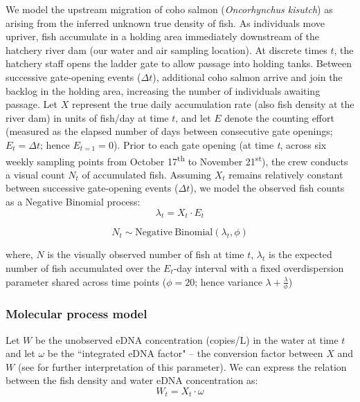 \documentclass{article}
\begin{document}
We model the upstream migration of coho salmon (\textit{Oncorhynchus kisutch}) as arising from the inferred unknown true density of fish. As individuals move upriver, fish accumulate in a holding area immediately downstream of the hatchery river dam (our water and air sampling location). At discrete times $t$, the hatchery staff opens the ladder gate to allow passage into holding tanks. Between successive gate-opening events ($\Delta t$), additional coho salmon arrive and join the backlog in the holding area, increasing the number of individuals awaiting passage. Let $X$ represent the true daily accumulation rate (also fish density at the river dam) in units of fish/day at time $t$, and let $E$ denote the counting effort (measured as the elapsed number of days between consecutive gate openings; $E_t =\Delta t$; hence $ E_{t=1} = 0$). Prior to each gate opening (at time \textit{t}, across six weekly sampling points from October 17\textsuperscript{th} to November 21\textsuperscript{st}), the crew conducts a visual count $N_t$ of accumulated fish. Assuming $X_t$ remains relatively constant between successive gate-opening events ($\Delta t$), we model the observed fish counts as a Negative Binomial process:
\begin{equation}
\lambda_t = X_t \cdot E_t
\end{equation}

\begin{equation}
N_t \sim \mathrm{Negative\ Binomial}(\lambda_t, \phi)
\end{equation} 

where, $N$ is the visually observed number of fish at time $t$,  $\lambda_t$ is the expected number of fish accumulated over the $E_t$-day interval with a fixed overdispersion parameter shared across time points ($\phi =20$; hence variance $\lambda+\frac{\lambda}{\phi}$) \cite{welch1993,guri2024a}

\subsubsection{Molecular process model}
Let $W$ be the unobserved eDNA concentration (copies/L) in the water at time $t$ and let $\omega$ be the ``integrated eDNA factor" -- the conversion factor between $X$ and $W$ (see \cite{guri2024a} for further interpretation of this parameter). We can express the relation between the fish density and water eDNA concentration as:
\begin{equation}
W_{t} = X_{t} \cdot \omega
\end{equation}
\end{document}
